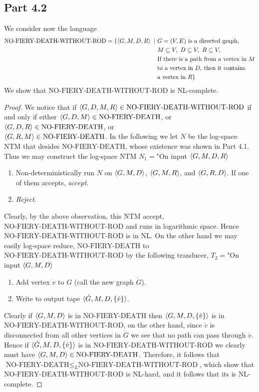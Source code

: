 \documentclass[a4paper,11pt]{article}
\newcommand{\pipe}{\ \vert \ }
\numberwithin{equation}{section}
\begin{document}
	\subsection*{Part 4.2}
	We consider now the language \begin{equation*}
		\begin{aligned}
		\text{NO-FIERY-DEATH-WITHOUT-ROD}=\{\braket{G,M,D,R}\pipe &G=(V,E)\text{ is a directed graph,}\\
		&M\subseteq V,\ D\subseteq V,\ R\subseteq V,\\
		&\text{If there is a path from a vertex in $ M $}\\
		&\text{to a vertex in $ D $, then it contains}\\
		&\text{a vertex in $ R $}\}
		\end{aligned}
	\end{equation*}
	We show that $ \text{NO-FIERY-DEATH-WITHOUT-ROD} $ is NL-complete.
	\begin{proof}
		We notice that if $ \braket{G,D,M,R}\in \text{NO-FIERY-DEATH-WITHOUT-ROD} $ if and only if either $ \braket{G,D,M}\in\text{NO-FIERY-DEATH} $, or $ \braket{G,D,R}\in\text{NO-FIERY-DEATH} $, or\\ $ \braket{G,R,M}\in\text{NO-FIERY-DEATH} $. In the following we let $ N $ be the log-space NTM that desides $ \text{NO-FIERY-DEATH} $, whose existence was shown in Part 4.1. Thus we may construct the log-space NTM $ N_1= $"On input $ \braket{G,M,D,R} $\begin{enumerate}
			\item Non-deterministically run $ N $ on $ \braket{G,M,D} $, $ \braket{G,M,R} $, and $ \braket{G,R,D} $. If one of them accepts, \emph{accept}.
			\item \emph{Reject}.
		\end{enumerate}
		Clearly, by the above observation, this NTM accept, $\text{NO-FIERY-DEATH-WITHOUT-ROD} $ and runs in logarithmic space. Hence $ \text{NO-FIERY-DEATH-WITHOUT-ROD} $ is in NL. On the other hand we may easily log-space reduce, $ \text{NO-FIERY-DEATH} $ to $ \text{NO-FIERY-DEATH-WITHOUT-ROD} $ by the following tranducer, $ T_2= $"On input $ \braket{G,M,D} $\begin{enumerate}
			\item Add vertex $ \dot{v} $ to $ G $ (call the new graph $ \dot{G} $).
			\item Write to output tape $ \braket{\dot{G},M,D,\{\dot{v}\}} $.
		\end{enumerate}
		Clearly if $ \braket{G,M,D} $ is in $ \text{NO-FIERY-DEATH}  $ then $ \braket{G,M,D,\{\dot{v}\}} $ is in\\ $ \text{NO-FIERY-DEATH-WITHOUT-ROD} $, on the other hand, since $ \dot{v} $ is disconnected from all other vertices in $ \dot{G} $ we see that no path can pass through $ \dot{v} $. Hence if $ \braket{\dot{G},M,D,\{\dot{v}\}} $ is in $ \text{NO-FIERY-DEATH-WITHOUT-ROD} $ we clearly must have $ \braket{G,M,D}\in \text{NO-FIERY-DEATH} $. Therefore, it follows that $ \text{NO-FIERY-DEATH}\leq_L \text{NO-FIERY-DEATH-WITHOUT-ROD} $, which show that $ \text{NO-FIERY-DEATH-WITHOUT-ROD} $ is NL-hard, and it follows that its is NL-complete.
	\end{proof}
\end{document}
